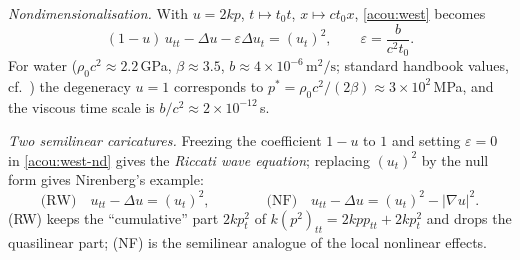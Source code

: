 \emph{Nondimensionalisation.} With $u=2kp$, $t\mapsto t_0t$, $x\mapsto ct_0x$,
\eqref{acou:west} becomes
\begin{equation}\label{acou:west-nd}
  (1-u)\,u_{tt}-\Delta u-\varepsilon\Delta u_t=(u_t)^2,\qquad
  \varepsilon=\frac{b}{c^2t_0}.
\end{equation}
For water ($\rho_0c^2\approx2.2\,$GPa, $\beta\approx3.5$,
$b\approx4\times10^{-6}\,\mathrm{m^2/s}$; standard handbook values, cf.\
\cite{HamiltonBlackstock1998}) the degeneracy $u=1$ corresponds to
$p^\ast=\rho_0c^2/(2\beta)\approx 3\times10^{2}\,$MPa, and the viscous time
scale is $b/c^2\approx2\times10^{-12}\,$s.

\emph{Two semilinear caricatures.} Freezing the coefficient $1-u$ to $1$ and
setting $\varepsilon=0$ in \eqref{acou:west-nd} gives the \emph{Riccati wave
equation}; replacing $(u_t)^2$ by the null form gives Nirenberg's example:
\begin{equation}\label{acou:models}
  \text{(RW)}\quad u_{tt}-\Delta u=(u_t)^2,\qquad\qquad
  \text{(NF)}\quad u_{tt}-\Delta u=(u_t)^2-|\nabla u|^2 .
\end{equation}
(RW) keeps the ``cumulative'' part $2kp_t^2$ of $k(p^2)_{tt}=2kpp_{tt}+2kp_t^2$
and drops the quasilinear part; (NF) is the semilinear analogue of the local
nonlinear effects.

